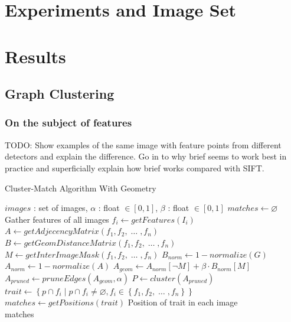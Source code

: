 \documentclass{article}
\begin{document}
\section{Experiments and Image Set}
\label{experiment}

\section{Results}
\label{results}
\subsection{Graph Clustering}


\subsubsection{On the subject of features}

TODO: Show examples of the same image with feature points from different 
detectors and explain the difference. Go in to why brief seems to work 
best in practice and superficially explain how brief works compared with 
SIFT. 



\begin{algorithm}
\caption{Cluster-Match Algorithm With Geometry}
\label{alg-geometry}
\begin{algorithmic}
\Require $images$ : set of images, $\alpha$ : float $\in \left[0, 
1\right]$, $\beta$ : float $\in \left[0, 1\right]$
\State $matches\gets \varnothing$
 \Comment Gather features of all images
	\State $f_i\gets getFeatures(I_i)$
\EndFor
\State $A\gets getAdjecencyMatrix(f_1, f_2,\; \ldots \;, f_n)$
\State $B\gets getGeomDistanceMatrix(f_1, f_2,\; \ldots \;, f_n)$
\State $M\gets getInterImageMask(f_1, f_2,\; \ldots \;, f_n)$
\State $B_{norm}\gets 1 - normalize(G)$ \State $A_{norm}\gets 1 - 
normalize(A)$
\State $A_{geom}\gets A_{norm}\left[ \neg M\right] + \beta \cdot 
B_{norm}\left[M\right]$
\State $A_{pruned}\gets pruneEdges(A_{geom},\alpha)$
\State $P\gets cluster(A_{pruned})$ 
	\State $trait\gets \left\{p \cap f_i \mid p \cap f_i \neq 
\varnothing, f_i \in \left\{f_1, f_2,\; \ldots \;, f_n\right\}\right\}$
		\State $matches\gets getPositions(trait)$
		\Comment Position of trait in each image
	\EndIf
\EndFor \\
\Return matches
\end{algorithmic}
\end{algorithm}
\end{document}
